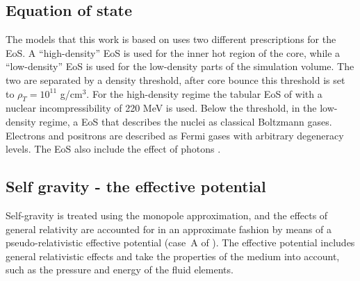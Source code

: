 \subsection{Equation of state}
The models that this work is based on uses two different prescriptions
for the EoS. A ``high-density'' EoS is used for the inner
hot region of the core, while a ``low-density'' EoS is used for the low-density
parts of the simulation volume. The two are separated by a density threshold,
after core bounce this threshold is set to $\rho_T = 10^{11}$ g/cm$^3$.
For the high-density regime the tabular EoS of 
\cite{lattimer_91} with a nuclear incompressibility of 220 MeV is used. 
Below the threshold, in the low-density regime, a EoS that describes the nuclei as
classical Boltzmann gases. Electrons and positrons are described as Fermi gases with 
arbitrary degeneracy levels. The EoS also include the effect of photons \citep{janka_99}.

\subsection{Self gravity - the effective potential}
Self-gravity is treated using the monopole                      
approximation, and the effects of general relativity are accounted for                                               
in an approximate fashion by means of a pseudo-relativistic                                                          
effective potential (case~A of \citealt{marek_06}). 
The effective potential includes general relativistic effects and
take the properties of the medium into account, such as the pressure and energy
of the fluid elements. 

